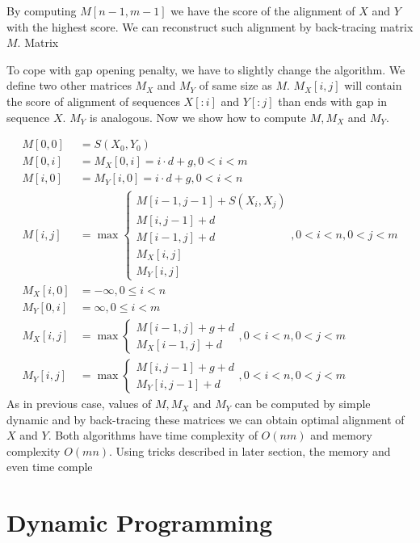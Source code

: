 By computing $M[n-1,m-1]$ we have the score of the alignment of $X$ and $Y$ with
the highest score. We can reconstruct such alignment by back-tracing matrix $M$.
Matrix 

To cope with gap opening penalty, we have to slightly change the algorithm.
We define two other matrices $M_X$ and $M_Y$ of same size as $M$. $M_X[i,j]$
will contain the score of alignment of sequences $X[:i]$ and $Y[:j]$ than ends
with gap in sequence $X$. $M_Y$ is analogous. Now we show how to compute $M,M_X$
and $M_Y$. 

\begin{align}
M[0,0] &= S(X_0,Y_0)\\
M[0,i] &= M_X[0,i] = i\cdot d+g, 0 < i < m\\
M[i,0] &= M_Y[i,0] = i\cdot d+g, 0 < i < n\\
M[i,j] &= \max
\begin{cases}
 M[i-1,j-1]+S(X_i,X_j)\\
 M[i,j-1]+d\\
 M[i-1,j]+d\\
 M_X[i,j]\\
 M_Y[i,j]
\end{cases}, 0<i<n,0<j<m\\
M_X[i,0] &= -\infty, 0\leq i< n\\
M_Y[0,i] &= \infty, 0 \leq i< m\\
M_X[i,j] &= \max
\begin{cases}
M[i-1,j]+g+d\\
M_X[i-1,j]+d
\end{cases}, 0<i<n,0<j<m\\
M_Y[i,j] &= \max
\begin{cases}
M[i,j-1]+g+d\\
M_Y[i,j-1]+d
\end{cases}, 0<i<n,0<j<m
\end{align}
As in previous case, values of $M,M_X$ and $M_Y$ can be computed by simple
dynamic and by back-tracing these matrices we can obtain optimal alignment of
$X$ and $Y$.
Both algorithms have time complexity of $O(nm)$ and memory complexity $O(mn)$.
Using tricks described in later section, the memory and even time comple

\section{Dynamic Programming}

